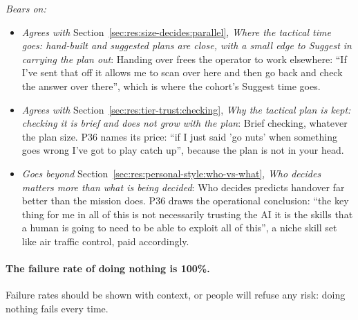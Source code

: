 \noindent\textit{Bears on:}
\begin{itemize}[leftmargin=1.2em,itemsep=1pt]\small
\item \textit{Agrees with} Section~\ref{sec:res:size-decides:parallel}, \emph{Where the tactical time goes: hand-built and suggested plans are close, with a small edge to Suggest in carrying the plan out}: Handing over frees the operator to work elsewhere: ``If I've sent that off it allows me to scan over here and then go back and check the answer over there'', which is where the cohort's Suggest time goes.
\item \textit{Agrees with} Section~\ref{sec:res:tier-trust:checking}, \emph{Why the tactical plan is kept: checking it is brief and does not grow with the plan}: Brief checking, whatever the plan size. P36 names its price: ``if I just said 'go nuts' when something goes wrong I've got to play catch up'', because the plan is not in your head.
\item \textit{Goes beyond} Section~\ref{sec:res:personal-style:who-vs-what}, \emph{Who decides matters more than what is being decided}: Who decides predicts handover far better than the mission does. P36 draws the operational conclusion: ``the key thing for me in all of this is not necessarily trusting the AI it is the skills that a human is going to need to be able to exploit all of this'', a niche skill set like air traffic control, paid accordingly.
\end{itemize}


\label{sec:qual:practitioner:pt-failure-rate}\paragraph{The failure rate of doing nothing is 100\%.}
Failure rates should be shown with context, or people will refuse any risk: doing nothing fails every time.


